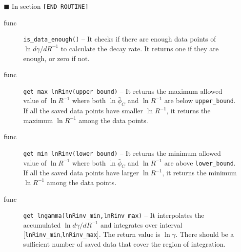 \documentclass[12pt]{article}
\begin{document}
\begin{itemize}
  \item[$\blacksquare$] In section \verb|[END_ROUTINE]|
 \begin{description}
  \item[func] \verb|is_data_enough()| -- It checks if there are enough
              data points of $\ln d\gamma/dR^{-1}$ to calculate the
              decay rate. It returns one if they are enough, or zero if
	      not.
  \item[func] \verb|get_max_lnRinv(upper_bound)| -- It returns the maximum
              allowed value of $\ln R^{-1}$ where both $\ln\bar\phi_C$ and
	      $\ln R^{-1}$ are
              below \verb|upper_bound|. If all the saved data points have
	      smaller $\ln R^{-1}$, it returns the maximum $\ln R^{-1}$
	      among the data points.
  \item[func] \verb|get_min_lnRinv(lower_bound)| -- It returns the
	      minimum allowed
              value of $\ln R^{-1}$ where both $\ln \bar\phi_C$ and 
              $\ln R^{-1}$ are
              above \verb|lower_bound|. If all the saved data points have
	      larger $\ln R^{-1}$, it returns the minimum $\ln R^{-1}$
	      among the data points.
  \item[func] \verb|get_lngamma(lnRinv_min,lnRinv_max)| -- It
              interpolates the accumulated $\ln d\gamma/dR^{-1}$ and
              integrates over interval
              [\verb|lnRinv_min|,\verb|lnRinv_max|]. The return value is
	      $\ln \gamma$. There should be a sufficient number of saved data
	      that cover the region of integration.
 \end{description}
\end{itemize}
\end{document}
